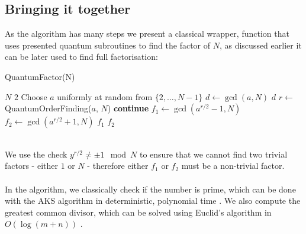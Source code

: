 \subsection{Bringing it together}
As the algorithm has many steps we present a classical wrapper, function that uses presented quantum subroutines to find the factor of $N$, as discussed earlier it can be later used to find full factorisation:
\begin{algorithm}
\caption{QuantumFactor(N)}
\begin{algorithmic}[1]
    \RETURN $N$
\ENDIF
{}
    \RETURN $2$
\ENDIF
\LOOP
    \STATE Choose $a$ uniformly at random from $\{2, \dots, N-1\}$
    \STATE $d \gets \gcd(a, N)$
        \RETURN $d$
    \ENDIF
    \STATE $r \gets$ QuantumOrderFinding($a$, $N$)
        \STATE \textbf{continue}
    \ENDIF
    \STATE $f_1 \gets \gcd(a^{r/2} - 1, N)$
    \STATE $f_2 \gets \gcd(a^{r/2} + 1, N)$
        \RETURN $f_1$
        \RETURN $f_2$
    \ENDIF
\ENDLOOP
\end{algorithmic}
\end{algorithm}
\\
We use the check $y^{r/2}\neq \pm1 \mod N$ to ensure that we cannot find two trivial factors - either $1$ or $N$ -  therefore either $f_1$ or $f_2$ must be a non-trivial factor.\\\\
In the algorithm, we classically check if the number is prime, which can be done with the AKS algorithm in deterministic, polynomial time \cite{Agrawal2004}. We also compute the greatest common divisor, which can be solved using Euclid's algorithm in $O(\log{(m+n)})$ \cite{cormen2009}.

